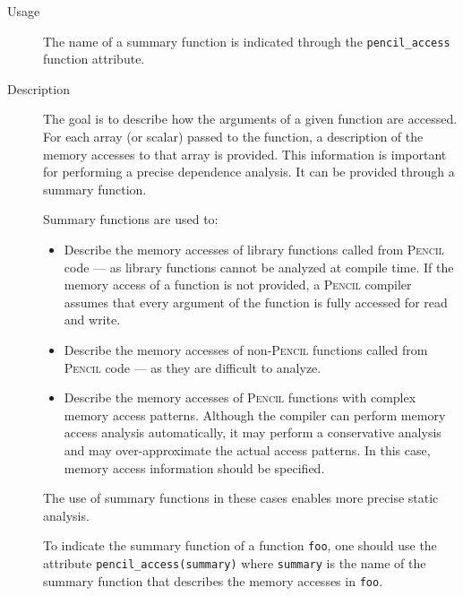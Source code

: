 \documentclass{carp}
\newcommand\pencil{\textsc{Pencil}\xspace}
\begin{document}

\begin{description}
  \item [Usage] The name of a summary function is indicated through
  the \lstinline!pencil_access! function attribute.

  \item [Description] The goal is to describe how the arguments of a given
  function are accessed.
  For each array (or scalar) passed to the function,
  a description of the memory accesses to that array is provided.
  This information is important for performing a precise dependence
  analysis.
  It can be provided through a summary function.
  
  Summary functions are used to:
    \begin{itemize}
     \item Describe the memory accesses of library functions
     called from \pencil code --- as library functions cannot be analyzed at
     compile time.
     If the memory access of a function is not provided, a \pencil
     compiler assumes that every argument of the function is fully accessed
     for read and write.
     
     \item Describe the memory accesses of non-\pencil
     functions called from \pencil code --- as they are difficult
     to analyze.

     \item Describe the memory accesses of \pencil functions with complex
     memory access patterns.
     Although the compiler can perform memory access analysis automatically,
     it may perform a conservative analysis and may over-approximate the
     actual access patterns.  In this case, memory access information should
     be specified.
    \end{itemize}

  The use of summary functions in these cases enables more
  precise static analysis.

  To indicate the summary function of a function \lstinline!foo!,
  one should use the attribute \lstinline!pencil_access(summary)! where
  \lstinline!summary! is the name of the summary function  that describes
  the memory accesses in \lstinline!foo!.
  

\end{description}
\end{document}
